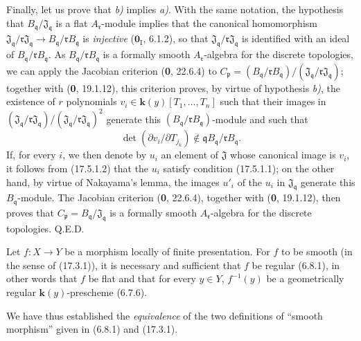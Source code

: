 Finally, let us prove that \emph{b)} implies \emph{a)}. With the same notation, the hypothesis that $B_{\mathfrak q}/\mathfrak J_{\mathfrak q}$ is a flat $A_{\mathfrak r}$-module implies that the canonical homomorphism $\mathfrak J_{\mathfrak q}/\mathfrak r\mathfrak J_{\mathfrak q}\to B_{\mathfrak q}/\mathfrak rB_{\mathfrak q}$ is \emph{injective} ($\mathbf{0}_{\mathrm I}$, 6.1.2), so that $\mathfrak J_{\mathfrak q}/\mathfrak r\mathfrak J_{\mathfrak q}$ is identified with an ideal of $B_{\mathfrak q}/\mathfrak rB_{\mathfrak q}$. As $B_{\mathfrak q}/\mathfrak rB_{\mathfrak q}$ is a formally smooth $A_{\mathfrak r}$-algebra for the discrete topologies, we can apply the Jacobian criterion (\textbf{0}, 22.6.4) to $C_{\mathfrak p}=(B_{\mathfrak q}/\mathfrak rB_{\mathfrak q})/(\mathfrak J_{\mathfrak q}/\mathfrak r\mathfrak J_{\mathfrak q})$; together with (\textbf{0}, 19.1.12), this criterion proves, by virtue of hypothesis \emph{b)}, the existence of $r$ polynomials $v_i\in\boldsymbol{k}(y)[T_1,\ldots,T_n]$ such that their images in $(\mathfrak J_{\mathfrak q}/\mathfrak r\mathfrak J_{\mathfrak q})/(\mathfrak J_{\mathfrak q}/\mathfrak r\mathfrak J_{\mathfrak q})^2$ generate this $(B_{\mathfrak q}/\mathfrak rB_{\mathfrak q})$-module and such that
\[
\label{IV.17.5.1.2}
\det(\partial v_i/\partial T_{j_k})\notin\mathfrak qB_{\mathfrak q}/\mathfrak rB_{\mathfrak q}.
\tag{17.5.1.2}
\]
If, for every $i$, we then denote by $u_i$ an element of $\mathfrak J$ whose canonical image is $v_i$, it follows from (17.5.1.2) that the $u_i$ satisfy condition (17.5.1.1); on the other hand, by virtue of Nakayama's lemma, the images $u'_i$ of the $u_i$ in $\mathfrak J_{\mathfrak q}$ generate this $B_{\mathfrak q}$-module. The Jacobian criterion (\textbf{0}, 22.6.4), together with (\textbf{0}, 19.1.12), then proves that $C_{\mathfrak p}=B_{\mathfrak q}/\mathfrak J_{\mathfrak q}$ is a formally smooth $A_{\mathfrak r}$-algebra for the discrete topologies. Q.E.D.

\begin{corollary}[17.5.2]
\label{IV.17.5.2}
Let $f:X\to Y$ be a morphism locally of finite presentation. For $f$ to be smooth \textup{(}in the sense of \textup{(17.3.1))}, it is necessary and sufficient that $f$ be regular \textup{(6.8.1)}, in other words that $f$ be flat and that for every $y\in Y$, $f^{-1}(y)$ be a geometrically regular $\boldsymbol{k}(y)$-prescheme \textup{(6.7.6)}.
\end{corollary}

We have thus established the \emph{equivalence} of the two definitions of ``smooth morphism'' given in (6.8.1) and (17.3.1).

